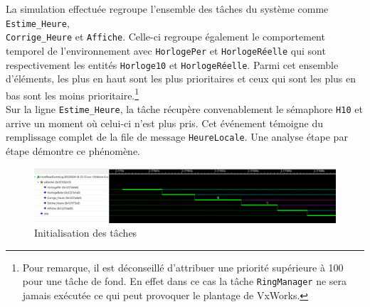 \documentclass[french]{article}
\begin{document}
	La simulation effectuée regroupe l'ensemble des tâches du système comme \texttt{Estime\_Heure},\\ \texttt{Corrige\_Heure} et \texttt{Affiche}. Celle-ci regroupe également le comportement temporel de l'environnement avec \texttt{HorlogePer} et \texttt{HorlogeRéelle} qui sont respectivement les entités \texttt{Horloge10} et \texttt{HorlogeRéelle}. Parmi cet ensemble d'éléments, les plus en haut sont les plus prioritaires et ceux qui sont les plus en bas sont les moins prioritaire.\footnote{Pour remarque, il est déconseillé d'attribuer une priorité supérieure à 100 pour une tâche de fond. En effet dans ce cas la tâche \texttt{RingManager} ne sera jamais exécutée ce qui peut provoquer le plantage de VxWorks.}\\
	Sur la ligne \texttt{Estime\_Heure}, la tâche récupère convenablement le sémaphore \texttt{H10} et arrive un moment où celui-ci n'est plus pris. Cet événement témoigne du remplissage complet de la file de message \texttt{HeureLocale}. Une analyse étape par étape démontre ce phénomène.
	
	\begin{figure}[H]
		\centering
		\includegraphics[width=1\linewidth]{../affichage_ralenti/lancement des taches.PNG}
		\caption{Initialisation des tâches}
		\label{fig:init_task_classique}
	\end{figure}
\end{document}
